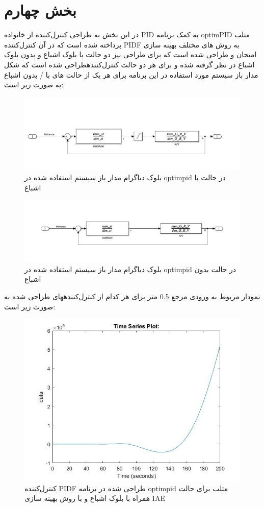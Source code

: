 \chapter{بخش چهارم}
در این بخش به طراحی کنترل‌کننده از خانواده  PID به کمک برنامه optimPID متلب پرداخته شده است که در آن کنترل‌کننده PIDF به روش های مختلف بهینه سازی امتحان و طراحی شده است که برای طراحی نیز دو حالت با بلوک اشباع و بدون بلوک اشباع در نظر گرفته شده و برای هر دو حالت کنترل‌کنندهطراحی شده است که شکل مدار باز سیستم مورد استفاده در این برنامه برای هر یک از حالت های با / بدون اشباع به صورت زیر است:

\begin{figure}[H]
	\centering
	\includegraphics[width=12cm]{../Figure/P_IV/OL_optimpid_with_sat.jpg}
	\caption{بلوک دیاگرام مدار باز سیستم استفاده شده در optimpid در حالت با اشباع}
\end{figure}

\begin{figure}[H]
	\centering
	\includegraphics[width=12cm]{../Figure/P_IV/OL_optimpid_without_sat.jpg}
	\caption{بلوک دیاگرام مدار باز سیستم استفاده شده در optimpid در حالت بدون اشباع}
\end{figure}



نمودار مربوط به ورودی مرجع 0.5 متر برای هر کدام از کنترل‌کنندههای طراحی شده به صورت زیر است:
\begin{figure}[H]
	\centering
	\includegraphics[width=12cm]{../Figure/P_IV/PID_IAE_with_sat.jpg}
	\caption{کنترل‌کننده PIDF طراحی شده در برنامه optimpid متلب برای حالت همراه با بلوک اشباع و با روش بهینه سازی IAE}
\end{figure}

